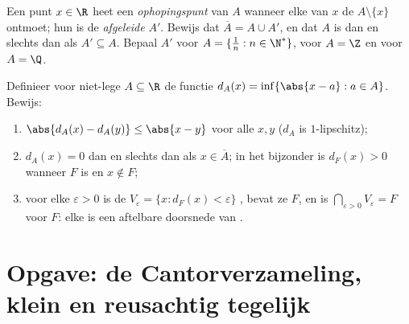 \begin{exercise}[$\star\star$]\label{exo:b1:topology:11}
Een punt $x \in \R$ heet een \emph{ophopingspunt} van $A$ wanneer elke
 van $x$ de  $A \setminus \{x\}$ ontmoet; hun
 is de \emph{afgeleide } $A'$. Bewijs dat
$\overline A = A \cup A'$, en dat $A$  is dan en slechts dan als
$A' \subseteq A$. Bepaal $A'$ voor $A = \{\frac 1n : n \in \N^*\}$, voor
$A = \Z$ en voor $A = \Q$.
\end{exercise}

\begin{exercise}[$\star\star\star$]\label{exo:b1:topology:12}
Definieer voor niet-lege $A \subseteq \R$ de functie $d_A(x) =
\inf\{\abs{x - a} : a \in A\}$. Bewijs:
\begin{enumerate}
  \item $\abs{d_A(x) - d_A(y)} \leq \abs{x - y}$ voor alle $x, y$ ($d_A$
        is $1$-lipschitz);
  \item $d_A(x) = 0$ dan en slechts dan als $x \in \overline A$; in het
        bijzonder is $d_F(x) > 0$ wanneer $F$  is en $x \notin
        F$;
  \item voor elke $\varepsilon > 0$ is de  $V_\varepsilon =
        \{x : d_F(x) < \varepsilon\}$ , bevat ze $F$, en is
        $\bigcap_{\varepsilon > 0} V_\varepsilon = F$ voor  $F$:
        elke  is een aftelbare doorsnede van .
\end{enumerate}
\end{exercise}

\section{Opgave: de Cantorverzameling, klein en reusachtig tegelijk}

